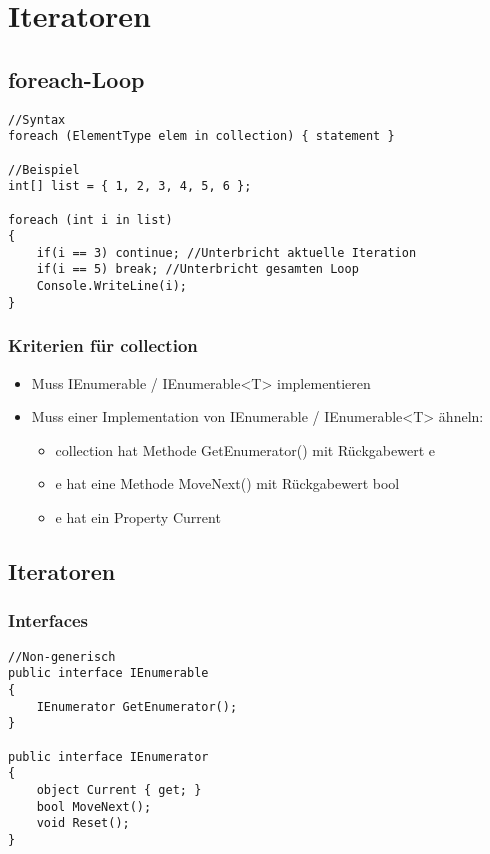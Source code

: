 \section{Iteratoren}

\begin{multicols*}{2}
\subsection{foreach-Loop}
\begin{lstlisting}
//Syntax
foreach (ElementType elem in collection) { statement }

//Beispiel
int[] list = { 1, 2, 3, 4, 5, 6 };

foreach (int i in list)
{
    if(i == 3) continue; //Unterbricht aktuelle Iteration
    if(i == 5) break; //Unterbricht gesamten Loop
    Console.WriteLine(i);
}
\end{lstlisting}
\subsubsection{Kriterien für collection}
\begin{itemize}
    \item Muss IEnumerable / IEnumerable<T> implementieren
    \item Muss einer Implementation von IEnumerable / IEnumerable<T> \dq ähneln\dq:
    \begin{itemize}
        \item collection hat Methode GetEnumerator() mit Rückgabewert e
        \item e hat eine Methode MoveNext() mit Rückgabewert bool
        \item e hat ein Property Current
    \end{itemize}
\end{itemize}

\subsection{Iteratoren}
\subsubsection{Interfaces}
\begin{lstlisting}
//Non-generisch
public interface IEnumerable
{
    IEnumerator GetEnumerator();
}

public interface IEnumerator
{
    object Current { get; }
    bool MoveNext();
    void Reset();
}


\end{lstlisting}
\end{multicols*}

